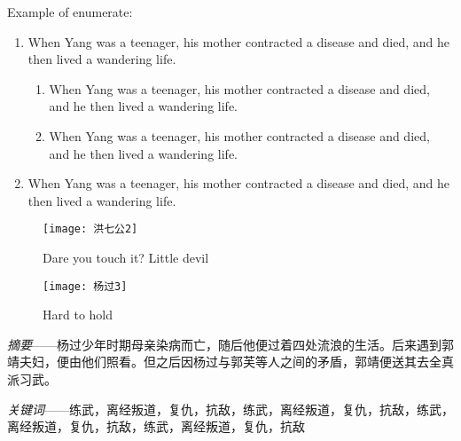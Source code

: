 \documentclass[print, doctor, vlined]{DissertUESTC}
\begin{document}
	\null

	Example of enumerate:

	\begin{enumerate}
		\item When Yang was a teenager, his mother contracted a disease and died, and he then lived a wandering life.
		\begin{enumerate}
			\item When Yang was a teenager, his mother contracted a disease and died, and he then lived a wandering life.
			\item When Yang was a teenager, his mother contracted a disease and died, and he then lived a wandering life.
		\end{enumerate}
		\item When Yang was a teenager, his mother contracted a disease and died, and he then lived a wandering life.
	\end{enumerate}
	

	\begin{figure}[!htb]
		\centering
		\texttt{[image: 洪七公2]}
		\captionsetup{list=no}%
		\caption{Dare you touch it? Little devil}
	\end{figure}
	
	\begin{figure}[!htb]
		\centering
		\texttt{[image: 杨过3]}
		\captionsetup{list=no}%
		\caption{Hard to hold}
	\end{figure}




	\textit{摘要}——杨过少年时期母亲染病而亡，随后他便过着四处流浪的生活。后来遇到郭靖夫妇，便由他们照看。但之后因杨过与郭芙等人之间的矛盾，郭靖便送其去全真派习武。

	\textit{关键词}——练武，离经叛道，复仇，抗敌，练武，离经叛道，复仇，抗敌，练武，离经叛道，复仇，抗敌，练武，离经叛道，复仇，抗敌

\end{document}
